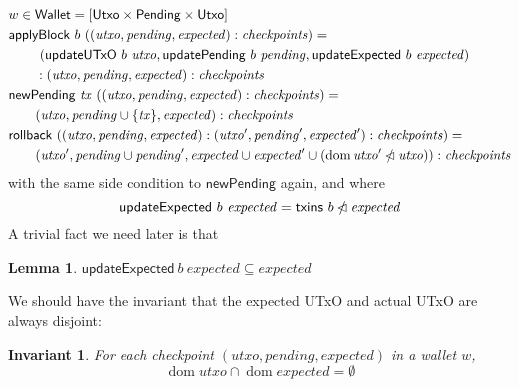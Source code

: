 \documentclass{article}
\DeclareMathOperator{\dom}{dom}
\newcommand{\restrictdom}{\lhd}
\newcommand{\subtractdom}{\mathbin{\slashed{\restrictdom}}}
\newtheorem{lemma}{Lemma}
\newtheorem{invariant}{Invariant}
\begin{document}
\begin{align*}
& w \in \mathsf{Wallet} = [\mathsf{Utxo} \times \mathsf{Pending} \times \mathsf{Utxo}] \\
& \mathsf{applyBlock} ~ b ~ ((\mathit{utxo}, \mathit{pending}, \mathit{expected}) : \mathit{checkpoints}) = \\
& \qquad ~ (\mathsf{updateUTxO} ~ b ~ \mathit{utxo}, \mathsf{updatePending} ~ b ~ \mathit{pending}, \mathsf{updateExpected} ~ b ~ \mathit{expected}) \\
& \qquad : (\mathit{utxo}, \mathit{pending}, \mathit{expected}) : \mathit{checkpoints} \\
& \mathsf{newPending} ~ \mathit{tx} ~ ((\mathit{utxo}, \mathit{pending}, \mathit{expected}) : \mathit{checkpoints}) = \\
& \qquad (\mathit{utxo}, \mathit{pending} \cup \{\mathit{tx}\}, \mathit{expected}) : \mathit{checkpoints} \\
& \mathsf{rollback} ~ ((\mathit{utxo}, \mathit{pending}, \mathit{expected}) : (\mathit{utxo}', \mathit{pending}', \mathit{expected}') : \mathit{checkpoints}) = \\
& \qquad (\mathit{utxo}', \mathit{pending} \cup \mathit{pending}', \mathit{expected} \cup \mathit{expected}' \cup (\dom \mathit{utxo}' \subtractdom \mathit{utxo})) : \mathit{checkpoints} \\
\end{align*}
%
with the same side condition to $\mathsf{newPending}$ again, and where
%
\begin{equation*}
\mathsf{updateExpected} ~ b ~ \mathit{expected} = \mathsf{txins} ~ b \subtractdom \mathit{expected}
\end{equation*}
%
A trivial fact we need later is that
%
\begin{lemma} \label{lemma:updateExpected_is_filter}
\begin{math}
\mathsf{updateExpected} ~ b ~ \mathit{expected} \subseteq \mathit{expected}
\end{math}
\end{lemma}

We should have the invariant that the expected UTxO and actual UTxO are always disjoint:

\begin{invariant}
For each checkpoint $(\mathit{utxo}, \mathit{pending}, \mathit{expected})$ in a wallet $w$,
\begin{equation*}
\dom \mathit{utxo} \cap \dom \mathit{expected} = \emptyset
\end{equation*}
\end{invariant}
\end{document}
